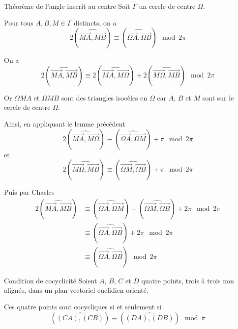 \documentclass[a4paper,12pt]{article}
\begin{document}
\pagebreak

\begin{theoreme}{Théorème de l'angle inscrit au centre}{}
    Soit $\Gamma$ un cercle de centre $\Omega$.

    Pour tous $A, B, M \in \Gamma$ distincts, on a
    $$
    2(\widehat{\overrightarrow{MA}, \overrightarrow{MB}}) \equiv (\widehat{\overrightarrow{\Omega A}, \overrightarrow{\Omega B}}) \mod 2\pi
    $$
\end{theoreme}

\tikzexternalenable
\begin{figure}[H]
    \centering
    \resizebox{0.7\textwidth}{!}{%
    
    }
\end{figure}
\tikzexternaldisable

\begin{demonstration}
    On a
    $$
    2(\widehat{\overrightarrow{MA}, \overrightarrow{MB}}) \equiv 2(\widehat{\overrightarrow{MA}, \overrightarrow{M\Omega}}) + 2(\widehat{\overrightarrow{M\Omega}, \overrightarrow{MB}}) \mod 2\pi
    $$

    Or $\Omega M A$ et $\Omega M B$ sont des triangles isocèles en $\Omega$ car $A$, $B$ et $M$ sont sur le cercle de centre $\Omega$.

    Ainsi, en appliquant le lemme précédent
    $$
    2(\widehat{\overrightarrow{MA}, \overrightarrow{M\Omega}}) \equiv (\widehat{\overrightarrow{\Omega A}, \overrightarrow{\Omega M}}) + \pi \mod 2\pi
    $$
    et
    $$
    2(\widehat{\overrightarrow{M\Omega}, \overrightarrow{MB}}) \equiv (\widehat{\overrightarrow{\Omega M}, \overrightarrow{\Omega B}}) + \pi \mod 2\pi
    $$

    Puis par Chasles
    \begin{align*}
        2(\widehat{\overrightarrow{MA}, \overrightarrow{MB}}) &\equiv (\widehat{\overrightarrow{\Omega A}, \overrightarrow{\Omega M}}) + (\widehat{\overrightarrow{\Omega M}, \overrightarrow{\Omega B}}) + 2\pi \mod 2\pi \\
        &\equiv (\widehat{\overrightarrow{\Omega A}, \overrightarrow{\Omega B}}) + 2\pi \mod 2\pi \\
        &\equiv (\widehat{\overrightarrow{\Omega A}, \overrightarrow{\Omega B}}) \mod 2\pi
    \end{align*}
\end{demonstration}

\begin{theoreme}{Condition de cocyclicité}{}
    Soient $A$, $B$, $C$ et $D$ quatre points, trois à trois non alignés, dans un plan vectoriel euclidien orienté.

    Ces quatre points sont cocycliques si et seulement si
    $$
    (\widehat{(CA), (CB)}) \equiv (\widehat{(DA), (DB)}) \mod \pi
    $$
\end{theoreme}
\end{document}
